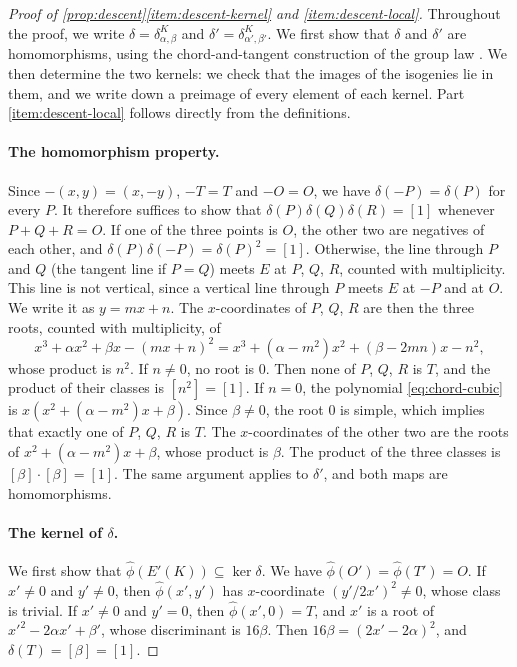 \documentclass[12pt,oneside,openany]{book}
\theoremstyle{definition}
\theoremstyle{plain}
\numberwithin{equation}{chapter}
\theoremstyle{plain}
\theoremstyle{definition}
\theoremstyle{remark}
\newcommand{\sq}[1]{[#1]}
\newcommand{\dual}{\hat\phi}
\begin{document}
\begin{proof}[Proof of \cref{prop:descent}\ref{item:descent-kernel} and \ref{item:descent-local}]
Throughout the proof, we write $\delta=\delta^K_{\alpha,\beta}$ and $\delta'=\delta^K_{\alpha',\beta'}$. We first show that $\delta$ and $\delta'$ are homomorphisms, using the chord-and-tangent construction of the group law \cite[Section~III.2, especially Proposition~III.2.2]{SilvermanAEC}. We then determine the two kernels: we check that the images of the isogenies lie in them, and we write down a preimage of every element of each kernel. Part \ref{item:descent-local} follows directly from the definitions.

\paragraph{The homomorphism property.} Since $-(x,y)=(x,-y)$, $-T=T$ and $-O=O$, we have $\delta(-P)=\delta(P)$ for every $P$. It therefore suffices to show that $\delta(P)\delta(Q)\delta(R)=\sq1$ whenever $P+Q+R=O$. If one of the three points is $O$, the other two are negatives of each other, and $\delta(P)\delta(-P)=\delta(P)^2=\sq1$. Otherwise, the line through $P$ and $Q$ (the tangent line if $P=Q$) meets $E$ at $P$, $Q$, $R$, counted with multiplicity. This line is not vertical, since a vertical line through $P$ meets $E$ at $-P$ and at $O$. We write it as $y=mx+n$. The $x$-coordinates of $P$, $Q$, $R$ are then the three roots, counted with multiplicity, of
\begin{equation}\label{eq:chord-cubic}
x^3+\alpha x^2+\beta x-(mx+n)^2=x^3+(\alpha-m^2)x^2+(\beta-2mn)x-n^2,
\end{equation}
whose product is $n^2$. If $n\ne0$, no root is $0$. Then none of $P$, $Q$, $R$ is $T$, and the product of their classes is $\sq{n^2}=\sq1$. If $n=0$, the polynomial \eqref{eq:chord-cubic} is $x(x^2+(\alpha-m^2)x+\beta)$. Since $\beta\ne0$, the root $0$ is simple, which implies that exactly one of $P$, $Q$, $R$ is $T$. The $x$-coordinates of the other two are the roots of $x^2+(\alpha-m^2)x+\beta$, whose product is $\beta$. The product of the three classes is $\sq\beta\cdot\sq\beta=\sq1$. The same argument applies to $\delta'$, and both maps are homomorphisms.

\paragraph{The kernel of $\delta$.} We first show that $\dual(E'(K))\subseteq\ker\delta$. We have $\dual(O')=\dual(T')=O$. If $x'\ne0$ and $y'\ne0$, then $\dual(x',y')$ has $x$-coordinate $(y'/2x')^2\ne0$, whose class is trivial. If $x'\ne0$ and $y'=0$, then $\dual(x',0)=T$, and $x'$ is a root of $x'^2-2\alpha x'+\beta'$, whose discriminant is $16\beta$. Then $16\beta=(2x'-2\alpha)^2$, and $\delta(T)=\sq\beta=\sq1$.


\end{proof}
\end{document}

